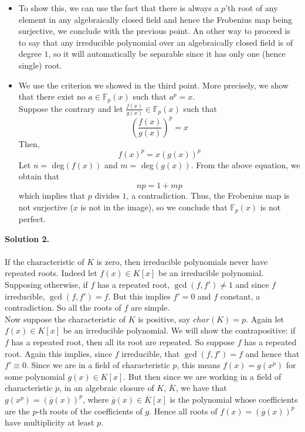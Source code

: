 \documentclass[12pt,a4paper]{article}
\begin{document}
\begin{itemize}
	\item To show this, we can use the fact that there is always a $p$'th root of any element in any algebraically closed field and hence the Frobenius map being surjective, we conclude with the previous point. An other way to proceed is to say that any irreducible polynomial over an algebraically closed field is of degree $1$, so it will automatically be separable since it has only one (hence single) root. 
	\item We use the criterion we showed in the third point. More precisely, we show that there exist no $a \in \mathbb{F}_p(x)$ such that $a^p = x$. \\
	Suppose the contrary and let $\frac{f(x)}{g(x)} \in \mathbb{F}_p(x)$ such that \[ \left(\frac{f(x)}{g(x)}\right)^p = x \] Then, \[ f(x)^p = x(g(x))^p \] Let $n = $ deg$(f(x))$ and $m = $ deg$(g(x))$. From the above equation, we obtain that \[ np = 1 + mp \] which implies that $p$ divides $1$, a contradiction. Thus, the Frobenius map is not surjective ($x$ is not in the image), so we conclude that $\mathbb{F}_p(x)$ is not perfect. 
\end{itemize}
\textbf{Solution 2.}\\
\\
If the characteristic of $K$ is zero, then irreducible polynomials never have repeated roots. Indeed let $f(x)\in K[x]$ be an irreducible polynomial. Supposing otherwise, if $f$ has a repeated root, $\gcd(f,f')\neq 1$ and since $f$ irreducible, $\gcd(f,f')=f$. But this implies $f'=0$ and $f$ constant, a contradiction. So all the roots of $f$ are simple. \\
Now suppose the characteristic of $K$ is positive, say $char(K)=p$. Again let $f(x)\in K[x]$ be an irreducible polynomial. We will show the contrapositive: if $f$ has a repeated root, then all its root are repeated. 
So suppose $f$ has a repeated root. Again this implies, since $f$ irreducible, that $\gcd(f,f')=f$ and hence that $f'\equiv0$. Since we are in a field of characteristic $p$, this means $f(x)=g(x^p)$ for some polynomial $g(x)\in K[x]$. But then since we are working in a field of characteristic $p$, in an algebraic closure of $K$, $\overline{K}$, we have that $g(x^p)=(\overline{g}(x))^p$, where $\overline{g}(x)\in \overline{K}[x]$ is the polynomial whose coefficients are the $p$-th roots of the coefficients of $g$. Hence all roots of $f(x)=(\overline{g}(x))^p$ have multiplicity at least $p$. \\
\\
\\
\end{document}
